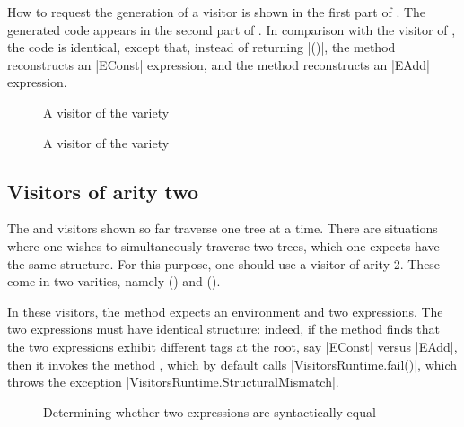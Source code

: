 \documentclass[onecolumn,11pt,nocopyrightspace]{sigplanconf}
\begin{document}
How to request the generation of a \map visitor is shown in the first part of
. The generated code appears in the second part of
. In comparison with the \iter visitor of ,
the code is identical, except that, instead of returning \oc|()|, the method
 reconstructs an \oc|EConst| expression, and the method
 reconstructs an \oc|EAdd| expression.


\begin{figure}[p]
\vspace{-\baselineskip}
\caption{A visitor of the \itertwo variety}
\label{fig:expr02}
\end{figure}

\begin{figure}[p]
\vspace{-\baselineskip}
\caption{A visitor of the \maptwo variety}
\label{fig:expr03}
\end{figure}

\subsection{Visitors of arity two}
\label{sec:intro:aritytwo}

The \iter and \map visitors shown so far traverse one tree at a time. There
are situations where one wishes to simultaneously traverse two trees, which
one expects have the same structure. For this purpose, one should use a
visitor of arity 2. These come in two varities, namely \itertwo
() and \maptwo ().

In these visitors, the method  expects an environment and
two expressions. The two expressions must have identical structure: indeed, if
the method  finds that the two expressions exhibit
different tags at the root, say \oc|EConst| versus \oc|EAdd|, then it invokes
the method , which by default calls \oc|VisitorsRuntime.fail()|,
which throws the exception \oc|VisitorsRuntime.StructuralMismatch|.

\begin{figure}[t]
\begin{origenv}

\end{origenv}
\caption{Determining whether two expressions are syntactically equal}
\label{fig:expr05}
\end{figure}
\end{document}
